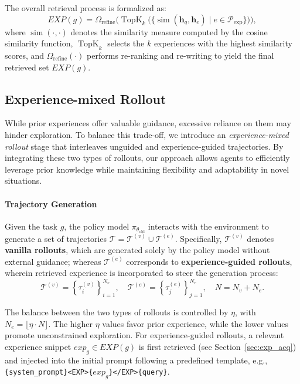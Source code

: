 The overall retrieval process is formalized as:
\begin{equation}
    EXP(g) = \Omega_{\text{refine}} \Big( 
        \operatorname{TopK}_k \big( 
            \{ \operatorname{sim}(\mathbf{h}_q, \mathbf{h}_e) \mid e \in \mathcal{P}_{\text{exp}} \} 
        \big) 
    \Big),
\end{equation}
where $\operatorname{sim}(\cdot, \cdot)$ denotes the similarity measure computed by the cosine similarity function, $\operatorname{TopK}_k$ selects the $k$ experiences with the highest similarity scores, and $\Omega_{\text{refine}}(\cdot)$ performs re-ranking and re-writing to yield the final retrieved set $EXP(g)$.



\subsection{Experience-mixed Rollout}
While prior experiences offer valuable guidance, excessive reliance on them may hinder exploration. To balance this trade-off, we introduce an \emph{experience-mixed rollout} stage that interleaves unguided and experience-guided trajectories. By integrating these two types of rollouts, our approach allows agents to efficiently leverage prior knowledge while maintaining flexibility and adaptability in novel situations.

\paragraph{Trajectory Generation}
Given the task $g$, the policy model $\pi_{\theta_{\text{old}}}$ interacts with the environment to generate a set of trajectories $\mathcal{T}=\mathcal{T}^{(v)} \cup \mathcal{T}^{(e)}$.
Specifically, $\mathcal{T}^{(v)}$ denotes \textbf{vanilla rollouts}, which are generated solely by the policy model without external guidance; whereas $\mathcal{T}^{(e)}$ corresponds to \textbf{experience-guided rollouts}, wherein retrieved experience is incorporated to steer the generation process:
\begin{equation}
    \mathcal{T}^{(v)}=\left\{\tau_i^{(v)}\right\}_{i=1}^{N_v}, \quad \mathcal{T}^{(e)}=\left\{\tau_j^{(e)}\right\}_{j=1}^{N_e}, \quad N=N_v+N_e.
\end{equation}


The balance between the two types of rollouts is controlled by $\eta$, with $N_e=\lfloor \eta \cdot N \rfloor$. The higher $\eta$ values favor prior experience, while the lower values promote unconstrained exploration. For experience-guided rollouts, a relevant experience snippet $exp_g\in EXP(g)$ is first retrieved (see Section~\ref{sec:exp_acq}) and injected into the initial prompt following a predefined template, e.g.,  
\texttt{\colorbox{gray!10}{\{system\_prompt\}<EXP>\{$exp_g$\}</EXP>\{query\}}}.


